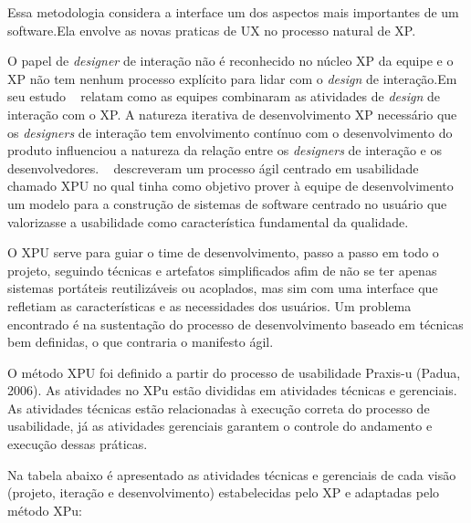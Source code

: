 Essa metodologia considera a interface um dos aspectos mais importantes de um software.Ela envolve as novas praticas de UX no processo natural de XP.

O papel de \emph{designer} de interação não é reconhecido no núcleo XP da equipe e o XP não tem nenhum processo explícito para lidar com o \emph{design} de interação.Em seu estudo ~ relatam como as equipes combinaram as atividades de \emph{design} de interação com o XP. 
%
A natureza iterativa de desenvolvimento XP necessário que os \emph{designers} de interação tem envolvimento contínuo com o desenvolvimento do produto influenciou a natureza da relação entre os \emph{designers} de interação e os desenvolvedores.
%
~ descreveram um processo ágil centrado em usabilidade chamado XPU no qual tinha como objetivo prover à equipe de desenvolvimento um modelo para a construção de sistemas de software centrado no usuário que valorizasse a usabilidade como característica fundamental da qualidade. 

O XPU serve para guiar o time de desenvolvimento, passo a passo em todo o projeto, seguindo técnicas e artefatos simplificados afim de não se ter apenas sistemas portáteis reutilizáveis ou acoplados, mas sim com uma interface que refletiam as características e as necessidades dos usuários. Um problema encontrado é na sustentação do processo de desenvolvimento baseado em técnicas bem definidas, o que contraria o manifesto ágil.

O método XPU foi definido a partir do processo de usabilidade Praxis-u (Padua, 2006). As atividades no XPu estão divididas em atividades técnicas e gerenciais. As atividades técnicas estão relacionadas à execução correta do processo de usabilidade, já as atividades gerenciais garantem o controle do andamento e execução dessas práticas.

Na tabela abaixo é apresentado as atividades técnicas e gerenciais de cada visão (projeto, iteração e desenvolvimento) estabelecidas pelo XP e adaptadas pelo método XPu:

